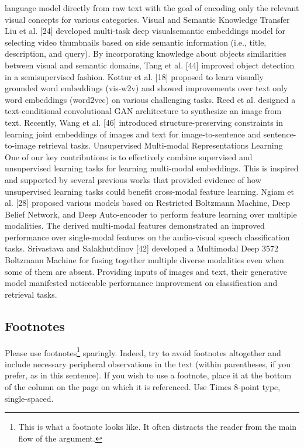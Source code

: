 \documentclass[10pt,twocolumn,letterpaper]{article}
\begin{document}
language model directly from raw text with the goal of encoding only the relevant visual concepts for various categories.
Visual and Semantic Knowledge Transfer
Liu et al. [24] developed multi-task deep visualsemantic embeddings model for selecting video thumbnails based on side semantic information (i.e., title, description, and query). By incorporating knowledge about
objects similarities between visual and semantic domains,
Tang et al. [44] improved object detection in a semisupervised fashion. Kottur et al. [18] proposed to learn
visually grounded word embeddings (vis-w2v) and showed
improvements over text only word embeddings (word2vec)
on various challenging tasks. Reed et al. designed a
text-conditional convolutional GAN architecture to synthesize an image from text. Recently, Wang et al. [46] introduced structure-preserving constraints in learning joint
embeddings of images and text for image-to-sentence and
sentence-to-image retrieval tasks.
Unsupervised Multi-modal Representations Learning
One of our key contributions is to effectively combine
supervised and unsupervised learning tasks for learning
multi-modal embeddings. This is inspired and supported by
several previous works that provided evidence of how unsupervised learning tasks could benefit cross-modal feature
learning.
Ngiam et al. [28] proposed various models based on
Restricted Boltzmann Machine, Deep Belief Network, and
Deep Auto-encoder to perform feature learning over multiple modalities. The derived multi-modal features demonstrated an improved performance over single-modal features on the audio-visual speech classification tasks. Srivastava and Salakhutdinov [42] developed a Multimodal Deep
3572
Boltzmann Machine for fusing together multiple diverse
modalities even when some of them are absent. Providing
inputs of images and text, their generative model manifested
noticeable performance improvement on classification and
retrieval tasks.

\subsection{Footnotes}

Please use footnotes\footnote {This is what a footnote looks like.  It
often distracts the reader from the main flow of the argument.} sparingly.
Indeed, try to avoid footnotes altogether and include necessary peripheral
observations in
the text (within parentheses, if you prefer, as in this sentence).  If you
wish to use a footnote, place it at the bottom of the column on the page on
which it is referenced. Use Times 8-point type, single-spaced.
\end{document}
